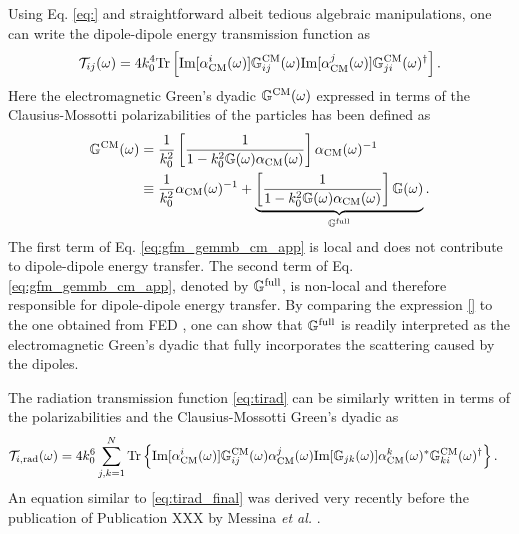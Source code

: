Using Eq. \eqref{eq:} and straightforward albeit tedious algebraic manipulations, one can write the dipole-dipole energy transmission function as
\begin{equation}
   \mathcal{T}_{ij}(\omega) = 4 k_0^4 \textrm{Tr} \left[ \textrm{Im}[\alpha^i_{\textrm{CM}}(\omega)] {\mathbb{G}}^{\textrm{CM}}_{ij}(\omega) \textrm{Im}[\alpha^j_{\textrm{CM}}(\omega)] {\mathbb{G}}^{\textrm{CM}}_{ji}(\omega)^{\dagger}\right]. \label{eq:tij_final}
\end{equation}
Here the electromagnetic Green's dyadic ${\mathbb{G}}^{\textrm{CM}}(\omega)$ expressed in terms of the Clausius-Mossotti polarizabilities of the particles has been defined as 
\begin{alignat}{2}
 {\mathbb{G}}^{\textrm{CM}}(\omega) &= \frac{1}{k_0^2} \left[\frac{1}{1-k_0^2 \mathbb{G}(\omega)\alpha_{\textrm{CM}}(\omega)}\right] \alpha_{\textrm{CM}}(\omega)^{-1} \\
  &\equiv \frac{1}{k_0^2} \alpha_{\textrm{CM}}(\omega)^{-1} + \underbrace{ \left[\frac{1}{1-k_0^2 \mathbb{G}(\omega)\alpha_{\textrm{CM}}(\omega)} \right] \mathbb{G}(\omega)}_{{\mathbb{G}}^{\textrm{full}}}. \label{eq:gfm_gemmb_cm_app}
\end{alignat}
The first term of Eq. \eqref{eq:gfm_gemmb_cm_app} is local and does not contribute to dipole-dipole energy transfer. The second term of Eq. \eqref{eq:gfm_gemmb_cm_app}, denoted by ${\mathbb{G}}^{\textrm{full}}$, is non-local and therefore responsible for dipole-dipole energy transfer. By comparing the expression \eqref{} to the one obtained from FED \cite{benabdallah11}, one can show that ${\mathbb{G}}^{\textrm{full}}$ is readily interpreted as the electromagnetic Green's dyadic that fully incorporates the scattering caused by the dipoles. %

The radiation transmission function \eqref{eq:tirad} can be similarly written in terms of the polarizabilities and the Clausius-Mossotti Green's dyadic as
\begin{alignat}{2}
 \mathcal{T}_{i,\textrm{rad}}(\omega) 
 &= 4 k_0^6 \sum_{j,k=1}^N \textrm{Tr}\left\{   \textrm{Im}[\alpha^i_{\textrm{CM}}(\omega)] {\mathbb{G}}^{\textrm{CM}}_{ij}(\omega) \alpha_{\textrm{CM}}^j(\omega) \textrm{Im}[\mathbb{G}_{jk}(\omega)] \alpha^k_{\textrm{CM}}(\omega)^* {\mathbb{G}}^{\textrm{CM}}_{ki}(\omega)^{\dagger} \right\}. \label{eq:tirad_final}
\end{alignat}
An equation similar to \eqref{eq:tirad_final} was derived very recently before the publication of Publication XXX by Messina \textit{et al.} \cite{messina13}.

